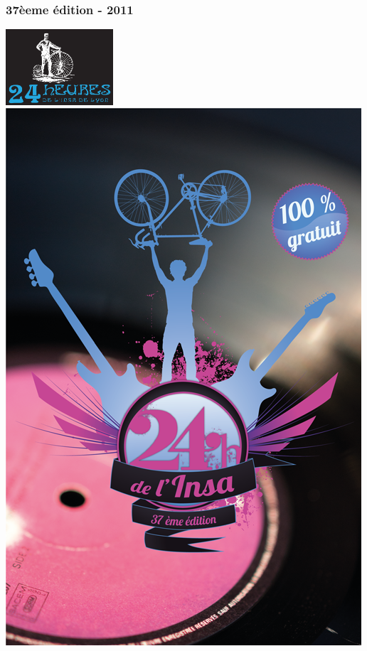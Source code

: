         \subsubsection{37èeme édition - 2011}            
            
            \includegraphics[width=0.3\textwidth]{img/oldschool.png}
            \includegraphics[width=\textwidth]{img/affiche-soiree.png} 
            
